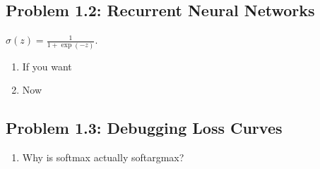 \documentclass{article}
\begin{document}
\clearpage %
\subsection*{Problem 1.2: Recurrent Neural Networks}

$\sigma(z)=\frac{1}{1+\exp(-z)}$.
\begin{enumerate}
  \item If you want

  \item Now
\end{enumerate}

\subsection*{Problem 1.3: Debugging Loss Curves}
%
\begin{enumerate}
  \item Why is softmax actually softargmax?
\end{enumerate}
\end{document}
